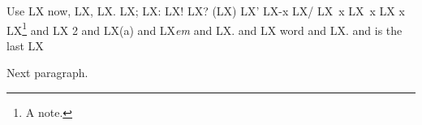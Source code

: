 \documentclass{article}
\newcommand{\lx}{LX\xspace}
\newcommand{\pnt}{.}
\newcommand{\word}{word}
\let\fullstop=.
\begin{document}
Use \lx now, \lx, \lx. \lx; \lx: \lx! \lx? (\lx) \lx' \lx-x \lx/ \lx~x \lx\ x \lx{} x
\lx\footnote{A note.} and \lx 2 and \lx(a) and \lx\emph{em} and \lx\pnt{} and \lx\word{} and \lx\fullstop{} and is
the last \lx

Next paragraph.
\end{document}

